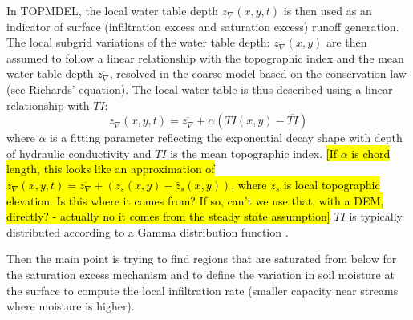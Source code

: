 \documentclass[twoside,10pt]{report}
\begin{document}
In TOPMDEL, the local water table depth $z_{\nabla}(x,y,t) $ is then used as an indicator of surface (infiltration excess and saturation excess) runoff generation. The local subgrid variations of the water table depth: $z_{\nabla}(x,y)$ are then assumed to follow a linear relationship with the topographic index and the mean water table depth $\overline{z_{\nabla}}$, resolved in the coarse model based on the conservation law (see Richards' equation). The local water table is thus described using a linear relationship with $TI$:
 \begin{equation}
    z_{\nabla}(x,y,t) = \overline{z_{\nabla}} +  \alpha (TI(x,y)-\overline{TI})
    \label{water_table_local_TOPMODEL}
\end{equation}
where $\alpha$ is a fitting parameter reflecting the exponential decay shape with depth of hydraulic conductivity \citep{Ambroise96} and $\overline{TI}$ is the mean topographic index. \hl{[If $\alpha$ is chord length, this looks like an approximation of $z_{\nabla}(x,y,t) = \overline{z_{\nabla}} + (z_s(x,y)-\bar z_s(x,y))$, where $z_s$ is local topographic elevation. Is this where it comes from? If so, can't we use that, with a DEM, directly? - actually no it comes from the steady state assumption]}  $TI$ is typically distributed according to a Gamma distribution function \citep{Sivapalan87}.

Then the main point is trying to find regions that are saturated from below for the saturation excess mechanism and to define the variation in soil moisture at the surface to compute the local infiltration rate (smaller capacity near streams where moisture is higher).
\end{document}
